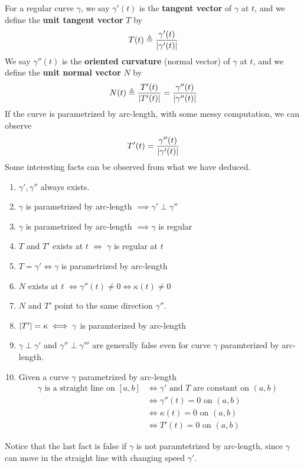 \documentclass{report}
\begin{document}
\begin{mdframed}
For a regular curve $\gamma $, we say $\gamma '(t)$ is the \textbf{tangent vector} of $\gamma $ at $t$, and we define the \textbf{unit tangent vector} $T$ by    
\begin{align*}
T(t)\triangleq \frac{\gamma '(t)}{\left|\gamma '(t)\right|}
\end{align*}
We say $\gamma ''(t)$ is the \textbf{oriented curvature} (normal vector) of $\gamma $ at $t$, and we define the  \textbf{unit normal vector} $N$ by 
 \begin{align*}
N(t)\triangleq \frac{T'(t)}{\left|T'(t)\right|}=\frac{\gamma ''(t)}{\left|\gamma ''(t)\right|}
\end{align*}
If the curve is parametrized by arc-length, with some messy computation, we can observe 
\begin{align*}
T'(t)=\frac{\gamma ''(t)}{\left|\gamma '(t)\right|}
\end{align*}
Some interesting facts can be observed from what we have deduced.
\begin{enumerate}[label=(\alph*)]
  \item $\gamma ',\gamma ''$ always exists. 
  \item $\gamma $ is parametrized by arc-length $\implies \gamma ' \perp \gamma ''$
  \item $\gamma $ is parametrized by arc-length $\implies \gamma $ is regular
  \item $T$ and $T'$ exists at $t$  $\iff $ $\gamma $ is regular at $t$ 
  \item $T=\gamma '\iff \gamma $ is parametrized by arc-length   
  \item $N$ exists at $t$ $\iff \gamma ''(t)\neq 0\iff  \kappa (t)\neq 0$  
  \item $N$ and  $T'$ point to the same direction $\gamma ''$.
  \item $\left|T'\right|=\kappa\iff \gamma $ is paramterized by arc-length 
  \item $\gamma \perp \gamma '$ and $\gamma'' \perp \gamma '''$ are generally false even for curve $\gamma $ paramterized by arc-length. 
  \item Given a curve $\gamma $ parametrized by arc-length
\begin{align*}
  \gamma \text{ is a straight line on }[a,b]&\iff  \gamma '\text{ and }T\text{ are constant on $(a,b)$ }\\
  &\iff \gamma ''(t)=0\text{ on $(a,b)$ }\\
  &\iff \kappa (t)=0\text{ on $(a,b)$ }\\
  &\iff T'(t)=0\text{ on }(a,b)
\end{align*}
\end{enumerate}
Notice that the last fact is false if $\gamma $ is not paramtetrized by arc-length, since $\gamma $ can move in the straight line with changing speed $\gamma '$.  
\end{mdframed}
\end{document}
